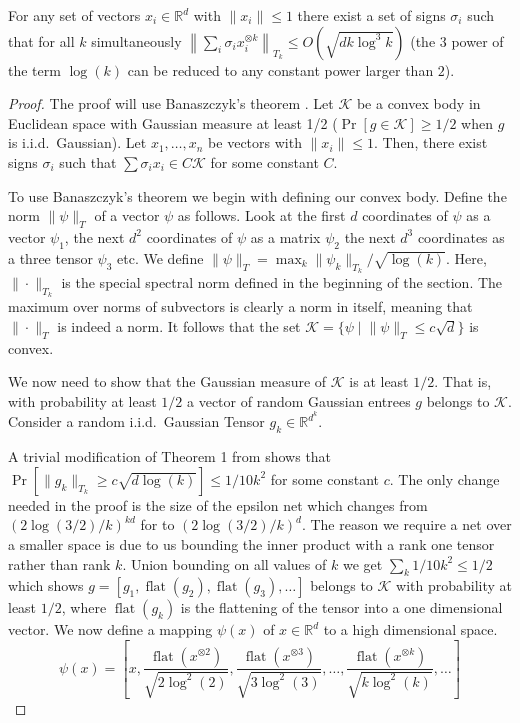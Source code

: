 \documentclass[anon,12pt]{colt2019} %
\newcommand{\R}{\mathbb{R}}
\renewcommand{\Pr}{\operatorname{Pr}}
\begin{document}
\begin{lemma}\label{uc}
For any set of vectors $x_i \in \R^d$ with $\|x_i\| \leq 1$ there exist a set of signs $\sigma_i$ such that for all $k$ simultaneously $\left\| \sum_i \sigma_i x_i^{\otimes k} \right\|_{T_k} \le O(\sqrt{d k\log^{3}{k}})$ (the $3$ power of the term $\log(k)$ can be reduced to any constant power larger than $2$). 
\end{lemma}
\begin{proof}
The proof will use Banaszczyk's theorem \cite{Banaszczyk}. 
Let $\mathcal K$ be a convex body in Euclidean space with Gaussian measure at least 1/2 ($\Pr[g \in \mathcal K] \ge 1/2$ when $g$ is i.i.d.\ Gaussian).
Let $x_1,\ldots,x_n$ be vectors with $\|x_i\| \leq 1$. 
Then, there exist signs $\sigma_i$ such that $\sum \sigma_i x_i \in C \mathcal K$ for some constant $C$.

To use Banaszczyk's theorem we begin with defining our convex body.
Define the norm $\|\psi\|_T$ of a vector $\psi$ as follows. Look at the first $d$ coordinates of $\psi$ as a vector $\psi_1$, the next $d^2$ coordinates of $\psi$ as a matrix $\psi_2$ the next $d^3$ coordinates as a three tensor $\psi_3$ etc.
We define $\|\psi\|_T = \max_k \|\psi_k\|_{T_k} /\sqrt{\log(k)}$. 
Here, $\|\cdot\|_{T_k}$ is the special spectral norm defined in the beginning of the section.
The maximum over norms of subvectors is clearly a norm in itself, meaning that $\|\cdot \|_T$ is indeed a norm. It follows that  the set $\mathcal K  = \{\psi \; | \; \|\psi\|_T \le c\sqrt{d}\}$ is convex. 

We now need to show that the Gaussian measure of $\mathcal K$ is at least $1/2$. 
That is, with probability at least $1/2$ a vector of random Gaussian entrees $g$ belongs to $\mathcal K$.
Consider a random i.i.d.\ Gaussian Tensor $g_k \in \R^{d^k}$. 

A trivial modification of Theorem 1 from \cite{tomioka2014spectral} shows that $\Pr[\|g_k\|_{T_k} \ge c\sqrt{d\log(k)}] \le 1/10k^2$ for some constant $c$. The only change needed in the proof is the size of the epsilon net which changes from $(2\log(3/2)/k)^{kd}$ for \cite{tomioka2014spectral} to $(2\log(3/2)/k)^d$. The reason we require a net over a smaller space is due to us bounding the inner product with a rank one tensor rather than rank $k$. Union bounding on all values of $k$ we get $\sum_k 1/10k^2 \le 1/2$ which shows $g = [g_1, \operatorname{flat}(g_2), \operatorname{flat}(g_3), \ldots]$ belongs to $\mathcal K$ with probability at least $1/2$, where $\operatorname{flat}(g_k)$ is the flattening of the tensor into a one dimensional vector. 
%
We now define a mapping $\psi(x)$ of $x\in \R^d$ to a high dimensional space. 
$$\psi(x) = \left[x, \frac{\operatorname{flat}(x^{\otimes 2})}{\sqrt{2\log^2(2)}}, \frac{\operatorname{flat}(x^{\otimes 3})}{\sqrt{3\log^2(3)}}, \ldots,\frac{\operatorname{flat}(x^{\otimes k})}{\sqrt{k\log^2(k)}},\ldots \right]$$


\end{proof}
\end{document}
